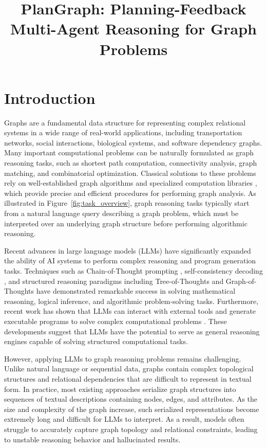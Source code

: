 \documentclass[sigconf,review,anonymous]{acmart}
\title{PlanGraph: Planning-Feedback Multi-Agent Reasoning for Graph Problems}
\begin{document}
\maketitle

\section{Introduction}

Graphs are a fundamental data structure for representing complex relational systems in a wide range of real-world applications, including transportation networks, social interactions, biological systems, and software dependency graphs. Many important computational problems can be naturally formulated as graph reasoning tasks, such as shortest path computation, connectivity analysis, graph matching, and combinatorial optimization. Classical solutions to these problems rely on well-established graph algorithms and specialized computation libraries \cite{cormen2009clrs,diestel2017graph,korte2018combinatorial,hagberg2008networkx}, which provide precise and efficient procedures for performing graph analysis. As illustrated in Figure~\ref{fig:task_overview}, graph reasoning tasks typically start from a natural language query describing a graph problem, which must be interpreted over an underlying graph structure before performing algorithmic reasoning.

Recent advances in large language models (LLMs) have significantly expanded the ability of AI systems to perform complex reasoning and program generation tasks. Techniques such as Chain-of-Thought prompting \cite{wei2022chain}, self-consistency decoding \cite{wang2023selfconsistency}, and structured reasoning paradigms including Tree-of-Thoughts \cite{yao2023tree} and Graph-of-Thoughts \cite{besta2024graph} have demonstrated remarkable success in solving mathematical reasoning, logical inference, and algorithmic problem-solving tasks. Furthermore, recent work has shown that LLMs can interact with external tools and generate executable programs to solve complex computational problems \cite{gao2023pal,schick2023toolformer,critic2023}. These developments suggest that LLMs have the potential to serve as general reasoning engines capable of solving structured computational tasks.

However, applying LLMs to graph reasoning problems remains challenging. Unlike natural language or sequential data, graphs contain complex topological structures and relational dependencies that are difficult to represent in textual form. In practice, most existing approaches serialize graph structures into sequences of textual descriptions containing nodes, edges, and attributes. As the size and complexity of the graph increase, such serialized representations become extremely long and difficult for LLMs to interpret. As a result, models often struggle to accurately capture graph topology and relational constraints, leading to unstable reasoning behavior and hallucinated results.
\end{document}
